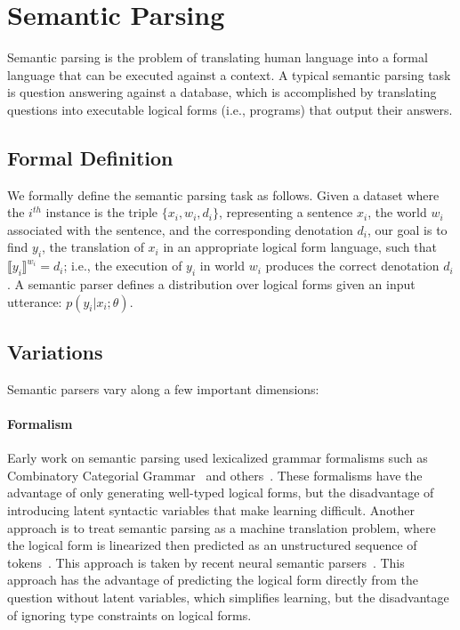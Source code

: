 \section{Semantic Parsing}
Semantic parsing is the problem of translating human language into a formal
language that can be executed against a context. A
typical semantic parsing task is question answering against a database, which
is accomplished by translating questions into executable logical forms (i.e.,
programs) that output their answers.

\subsection{Formal Definition}
We formally define the semantic parsing task as
follows. Given a dataset where the $i^{th}$ instance is the triple $\{x_i, w_i,
d_i\}$, representing a sentence $x_i$, the world $w_i$ associated with the
sentence, and the corresponding denotation $d_i$, our goal is to find $y_i$,
the translation of $x_i$ in an appropriate logical form language, such that
$\llbracket y_i\rrbracket^{w_i} = d_i$; i.e., the execution of $y_i$ in world $w_i$ produces
the correct denotation $d_i$.  A semantic parser defines a distribution over
logical forms given an input utterance: $p(y_i|x_i; \theta)$.

\subsection{Variations}
Semantic parsers vary along a few important dimensions:
\paragraph{Formalism} Early work on semantic parsing used lexicalized grammar
formalisms such as Combinatory Categorial
Grammar~\cite{zettlemoyer05,zettlemoyer2007online,kwiatkowski2011lexical,kwiatkowski2013,krishnamurthy2012weakly,artzi2013}
and
others~\cite{liang2011learning,berant2013,zhao2015,wong2006learning,wong2007learning}.
These formalisms have the advantage of only generating well-typed logical
forms, but the disadvantage of introducing latent syntactic variables that make
learning difficult. Another approach is to treat semantic parsing as a machine
translation problem, where the logical form is linearized then predicted as an
unstructured sequence of tokens~\citep{andreas2013}.  This approach is taken by
recent neural semantic parsers~\citep{jia2016,dong2016,locascio2016,ling2016}.
This approach has the advantage of predicting the logical form directly from
the question without latent variables, which simplifies learning, but the
disadvantage of ignoring type constraints on logical forms.

